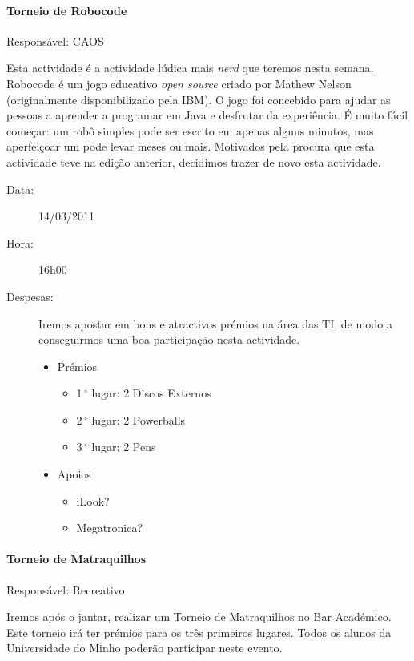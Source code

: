 \paragraph{Torneio de Robocode}
Responsável: CAOS

Esta actividade é a actividade lúdica mais \emph{nerd} que teremos nesta semana.
Robocode é um jogo educativo \emph{open source} criado por Mathew Nelson (originalmente disponibilizado pela IBM).
O jogo foi concebido para ajudar as pessoas a aprender a programar em Java e desfrutar da experiência. É muito fácil começar: um robô simples pode ser escrito em apenas alguns minutos, mas aperfeiçoar um pode levar meses ou mais.
Motivados pela procura que esta actividade teve na edição anterior, decidimos trazer de novo esta actividade.

\begin{description}
	\item[Data:] 14/03/2011
 	\item[Hora:] 16h00
\end{description}

\begin{description}
	\item[Despesas:] Iremos apostar em bons e atractivos prémios na área das TI, de modo a conseguirmos uma boa participação nesta actividade.
	\begin{itemize}
		\item Prémios
		\begin{itemize}
			\item 1$\,^{\circ}$ lugar: 2 Discos Externos
			\item 2$\,^{\circ}$ lugar: 2 Powerballs
			\item 3$\,^{\circ}$ lugar: 2 Pens
		\end{itemize}
		\item Apoios
		\begin{itemize}
			\item iLook?
			\item Megatronica?
		\end{itemize}
	\end{itemize}
\end{description}


\paragraph{Torneio de Matraquilhos}
Responsável: Recreativo

Iremos após o jantar, realizar um Torneio de Matraquilhos no Bar Académico. Este torneio irá ter prémios para os três primeiros lugares. Todos os alunos da Universidade do Minho poderão participar neste evento.

